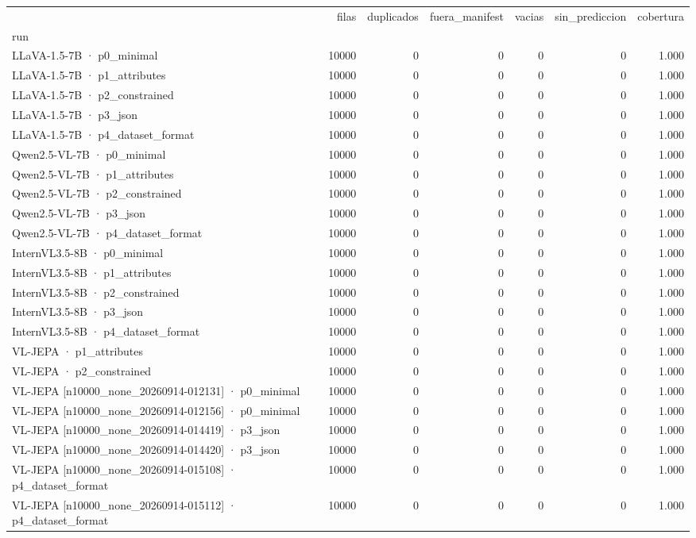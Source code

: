 \begin{tabular}{lrrrrrr}
\toprule
 & filas & duplicados & fuera\_manifest & vacias & sin\_prediccion & cobertura \\
run &  &  &  &  &  &  \\
\midrule
LLaVA-1.5-7B · p0\_minimal & 10000 & 0 & 0 & 0 & 0 & 1.000 \\
LLaVA-1.5-7B · p1\_attributes & 10000 & 0 & 0 & 0 & 0 & 1.000 \\
LLaVA-1.5-7B · p2\_constrained & 10000 & 0 & 0 & 0 & 0 & 1.000 \\
LLaVA-1.5-7B · p3\_json & 10000 & 0 & 0 & 0 & 0 & 1.000 \\
LLaVA-1.5-7B · p4\_dataset\_format & 10000 & 0 & 0 & 0 & 0 & 1.000 \\
Qwen2.5-VL-7B · p0\_minimal & 10000 & 0 & 0 & 0 & 0 & 1.000 \\
Qwen2.5-VL-7B · p1\_attributes & 10000 & 0 & 0 & 0 & 0 & 1.000 \\
Qwen2.5-VL-7B · p2\_constrained & 10000 & 0 & 0 & 0 & 0 & 1.000 \\
Qwen2.5-VL-7B · p3\_json & 10000 & 0 & 0 & 0 & 0 & 1.000 \\
Qwen2.5-VL-7B · p4\_dataset\_format & 10000 & 0 & 0 & 0 & 0 & 1.000 \\
InternVL3.5-8B · p0\_minimal & 10000 & 0 & 0 & 0 & 0 & 1.000 \\
InternVL3.5-8B · p1\_attributes & 10000 & 0 & 0 & 0 & 0 & 1.000 \\
InternVL3.5-8B · p2\_constrained & 10000 & 0 & 0 & 0 & 0 & 1.000 \\
InternVL3.5-8B · p3\_json & 10000 & 0 & 0 & 0 & 0 & 1.000 \\
InternVL3.5-8B · p4\_dataset\_format & 10000 & 0 & 0 & 0 & 0 & 1.000 \\
VL-JEPA · p1\_attributes & 10000 & 0 & 0 & 0 & 0 & 1.000 \\
VL-JEPA · p2\_constrained & 10000 & 0 & 0 & 0 & 0 & 1.000 \\
VL-JEPA [n10000\_none\_20260914-012131] · p0\_minimal & 10000 & 0 & 0 & 0 & 0 & 1.000 \\
VL-JEPA [n10000\_none\_20260914-012156] · p0\_minimal & 10000 & 0 & 0 & 0 & 0 & 1.000 \\
VL-JEPA [n10000\_none\_20260914-014419] · p3\_json & 10000 & 0 & 0 & 0 & 0 & 1.000 \\
VL-JEPA [n10000\_none\_20260914-014420] · p3\_json & 10000 & 0 & 0 & 0 & 0 & 1.000 \\
VL-JEPA [n10000\_none\_20260914-015108] · p4\_dataset\_format & 10000 & 0 & 0 & 0 & 0 & 1.000 \\
VL-JEPA [n10000\_none\_20260914-015112] · p4\_dataset\_format & 10000 & 0 & 0 & 0 & 0 & 1.000 \\
\bottomrule
\end{tabular}
